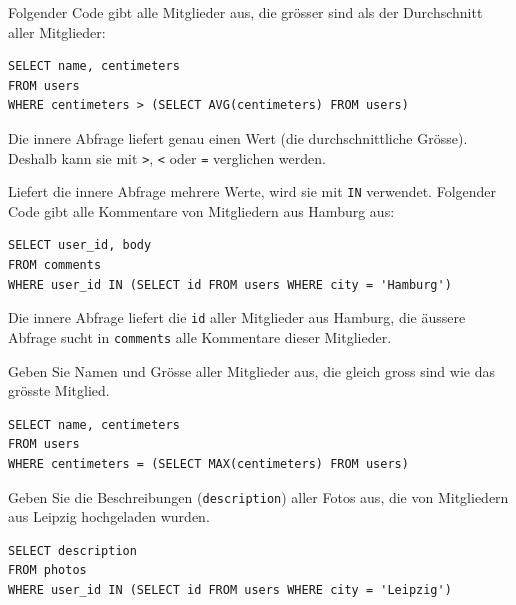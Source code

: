 \begin{myexample}\label{myexample:subquery-avg}
Folgender Code gibt alle Mitglieder aus, die grösser sind als der Durchschnitt aller Mitglieder:
\begin{lstlisting}
SELECT name, centimeters
FROM users
WHERE centimeters > (SELECT AVG(centimeters) FROM users)
\end{lstlisting}
Die innere Abfrage liefert genau einen Wert (die durchschnittliche Grösse). Deshalb kann sie mit \lstinline|>|, \lstinline|<| oder \lstinline|=| verglichen werden.
\end{myexample}

\begin{myexample}\label{myexample:subquery-in}
Liefert die innere Abfrage mehrere Werte, wird sie mit \lstinline|IN| verwendet. Folgender Code gibt alle Kommentare von Mitgliedern aus Hamburg aus:
\begin{lstlisting}
SELECT user_id, body
FROM comments
WHERE user_id IN (SELECT id FROM users WHERE city = 'Hamburg')
\end{lstlisting}
Die innere Abfrage liefert die \texttt{id} aller Mitglieder aus Hamburg, die äussere Abfrage sucht in \texttt{comments} alle Kommentare dieser Mitglieder.
\end{myexample}

\begin{myexercise}
  Geben Sie Namen und Grösse aller Mitglieder aus, die gleich gross sind wie das grösste Mitglied.
  \begin{myanswer}
    \begin{lstlisting}
SELECT name, centimeters
FROM users
WHERE centimeters = (SELECT MAX(centimeters) FROM users)
\end{lstlisting}
  \end{myanswer}
\end{myexercise}

\begin{myexercise}
  Geben Sie die Beschreibungen (\texttt{description}) aller Fotos aus, die von Mitgliedern aus Leipzig hochgeladen wurden.
  \begin{myanswer}
    \begin{lstlisting}
SELECT description
FROM photos
WHERE user_id IN (SELECT id FROM users WHERE city = 'Leipzig')
\end{lstlisting}
  \end{myanswer}
\end{myexercise}
